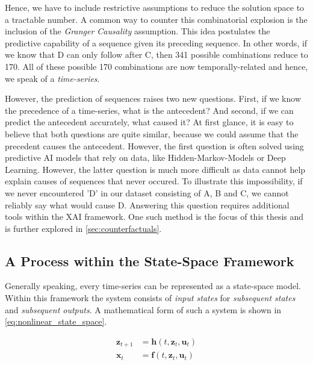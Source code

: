 \documentclass[12pt,a4paper]{report}
\begin{document}
Hence, we have to include restrictive assumptions to reduce the solution space to a tractable number. A common way to counter this combinatorial explosion is the inclusion of the \emph{Granger Causality} assumption. This idea postulates the predictive capability of a sequence given its preceding sequence. In other words, if we know that D can only follow after C, then 341 possible combinations reduce to 170. All of these possible 170 combinations are now temporally-related and hence, we speak of a \emph{time-series}.

However, the prediction of sequences raises two new questions. First, if we know the precedence of a time-series, what is the antecedent? And second, if we can predict the antecedent accurately, what caused it?
At first glance, it is easy to believe that both questions are quite similar, because we could assume that the precedent causes the antecedent. However,
the first question is often solved using predictive AI models that rely on data, like Hidden-Markov-Models or Deep Learning. However, the latter question is much more difficult as data cannot help explain causes of sequences that never occured. To illustrate this impossibility, if we never encountered 'D' in our dataset consisting of A, B and C, we cannot reliably say what would cause D. Answering this question requires additional tools within the \gls{XAI} framework. One such method is the focus of this thesis and is further explored in \autoref{sec:counterfactuals}.

\subsection{A Process within the State-Space Framework}
Generally speaking, every time-series can be represented as a state-space model\autocite{kalman_NewApproachLinear_1960a}. Within this framework the system consists of \emph{input states} for \emph{subsequent states} and \emph{subsequent outputs}. A mathematical form of such a system is shown in \autoref{eq:nonlinear_state_space}.

\begin{align}
    \label{eq:nonlinear_state_space}
    \mathbf{z}_{t+1} & =\mathbf{h}(t, \mathbf{z}_{t}, \mathbf{u}_{t}) \\
    \mathbf{x}_{t}   & =\mathbf{f}(t, \mathbf{z}_{t}, \mathbf{u}_{t}) \nonumber
\end{align}
\end{document}
